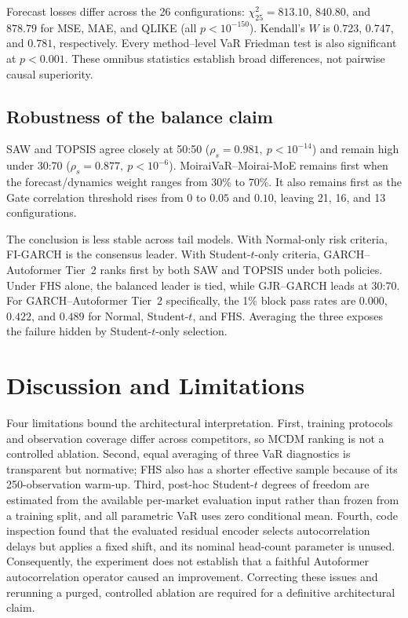 \documentclass[runningheads]{llncs}
\begin{document}
Forecast losses differ across the 26 configurations:
\(\chi^2_{25}=813.10\), \(840.80\), and \(878.79\) for MSE, MAE, and
QLIKE (all \(p<10^{-150}\)). Kendall's \(W\) is \(0.723\), \(0.747\),
and \(0.781\), respectively. Every method--level VaR Friedman test is
also significant at \(p<0.001\). These omnibus statistics establish
broad differences, not pairwise causal superiority.

\subsection{Robustness of the balance claim}

SAW and TOPSIS agree closely at 50:50
(\(\rho_s=0.981,\ p<10^{-14}\)) and remain high under 30:70
(\(\rho_s=0.877,\ p<10^{-6}\)). MoiraiVaR--Moirai-MoE remains first
when the forecast/dynamics weight ranges from 30\% to 70\%. It also
remains first as the Gate correlation threshold rises from \(0\) to
\(0.05\) and \(0.10\), leaving 21, 16, and 13 configurations.

The conclusion is less stable across tail models. With Normal-only risk
criteria, FI-GARCH is the consensus leader. With Student-\(t\)-only
criteria, GARCH--Autoformer Tier~2 ranks first by both SAW and TOPSIS
under both policies. Under FHS alone, the balanced leader is tied, while
GJR--GARCH leads at 30:70. For GARCH--Autoformer Tier~2 specifically,
the 1\% block pass rates are \(0.000\), \(0.422\), and \(0.489\) for
Normal, Student-\(t\), and FHS. Averaging the three exposes the failure
hidden by Student-\(t\)-only selection.

\section{Discussion and Limitations}

Four limitations bound the architectural interpretation. First,
training protocols and observation coverage differ across competitors,
so MCDM ranking is not a controlled ablation. Second, equal averaging
of three VaR diagnostics is transparent but normative; FHS also has a
shorter effective sample because of its 250-observation warm-up. Third,
post-hoc Student-\(t\) degrees of freedom are estimated from the
available per-market evaluation input rather than frozen from a
training split, and all parametric VaR uses zero conditional mean.
Fourth, code inspection found that the evaluated residual encoder
selects autocorrelation delays but applies a fixed shift, and its
nominal head-count parameter is unused. Consequently, the experiment
does not establish that a faithful Autoformer autocorrelation operator
caused an improvement. Correcting these issues and rerunning a purged,
controlled ablation are required for a definitive architectural claim.
\end{document}
